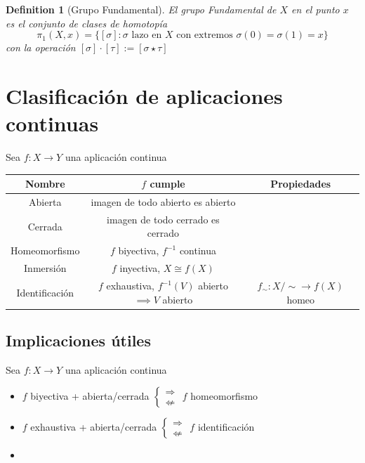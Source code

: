 \documentclass{myclass}
\newtheorem*{definition}{Definition}
\begin{document}
\begin{definition}[Grupo Fundamental]
  El grupo Fundamental de $X$ en el punto $x$ es el conjunto de clases de homotopía
  \[
  \pi_1(X, x) = \{[\sigma ] : \sigma \text{ lazo en } X \text{ con extremos } \sigma (0) = \sigma (1)=x\}
  \] 
  con la operación $[\sigma ]\cdot [\tau ] := [\sigma \star \tau ]$
\end{definition}




\section{Clasificación de aplicaciones continuas}
Sea $f:X\to Y$ una aplicación continua
\begin{center}
\begin{tabular}{|c|c|c|}
\hline
\textbf{Nombre}  & \textbf{$f$ cumple} & \textbf{Propiedades} \\
\hline
Abierta & imagen de todo abierto es abierto & \\
\hline
Cerrada & imagen de todo cerrado es cerrado & \\
\hline
Homeomorfismo & $f$ biyectiva,  $f^{-1}$ continua & \\
\hline
Inmersión & $f$ inyectiva, $X\cong f(X)$  &   \\
\hline
Identificación & $f$ exhaustiva, $ f^{-1}(V)$ abierto $\implies V$ abierto & $f_\sim : X / \sim \to  f(X)$ homeo \\
\hline

\end{tabular}
\end{center}
\subsection{Implicaciones útiles}
Sea $f:X\to Y$ una aplicación continua
\begin{itemize}[topsep=-6pt, itemsep=0pt]
  \item $f$ biyectiva + abierta/cerrada $\begin{cases}
    \Rightarrow \\ \not\Leftarrow
  \end{cases}$ $f$ homeomorfismo
  \item $f$ exhaustiva + abierta/cerrada  $\begin{cases} \Rightarrow \\ \not\Leftarrow \end{cases}$ $f$ identificación
  \item 
\end{itemize}
\end{document}
